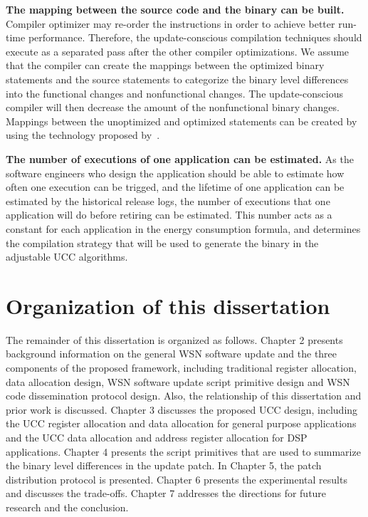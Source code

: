 \textbf{The mapping between the source code and the binary can be built.} Compiler optimizer may re-order the 
instructions in order to achieve better run-time performance. Therefore, the update-conscious compilation techniques 
should execute as a separated pass after the other compiler optimizations. 
We assume that the compiler can create the mappings between the optimized binary statements and the source statements 
to categorize the binary level differences into the functional changes and nonfunctional changes.
The update-conscious compiler will then decrease the amount of the nonfunctional binary changes.
Mappings between the unoptimized and optimized statements can be created by using the technology proposed 
by~\cite{mapping}.


\textbf{The number of executions of one application can be estimated.}
As the software engineers who design the application should be able to estimate how often one execution can be trigged, 
and the lifetime of one application can be estimated by the historical release logs, the number of executions that one 
application will do before retiring can be estimated. This number acts as a constant for each application in the energy 
consumption formula, and determines the compilation strategy that will be used to generate the binary in the adjustable 
UCC algorithms.

\section{Organization of this dissertation}
The remainder of this dissertation is organized as follows. 
Chapter 2 presents background information on the general WSN software update and the three components of 
the proposed framework, including traditional register allocation,
data allocation design, WSN software update script primitive design and WSN code dissemination protocol design.
Also, the relationship of this dissertation and prior work is discussed. 
Chapter 3 discusses the proposed UCC design, including the UCC register allocation and data allocation for
general purpose applications and the UCC data allocation and address register allocation for DSP applications.
Chapter 4 presents the script primitives that are used to summarize the binary level differences
in the update patch.
In Chapter 5, the patch distribution protocol is presented. 
Chapter 6 presents the experimental results and discusses the trade-offs.
Chapter 7 addresses the directions for future
research and the conclusion.
